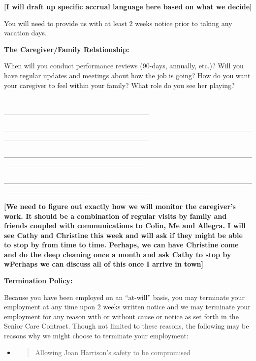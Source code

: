 \documentclass[]{article}
\begin{document}
\textbf{{[}I will draft up specific accrual language here based on what
we decide{]}}

You will need to provide us with at least 2 weeks notice prior to taking
any vacation days.

\textbf{The Caregiver/Family Relationship:}

When will you conduct performance reviews (90-days, annually, etc.)?
Will you have regular updates and meetings about how the job is going?
How do you want your caregiver to feel within your family? What role do
you see her playing?

\_\_\_\_\_\_\_\_\_\_\_\_\_\_\_\_\_\_\_\_\_\_\_\_\_\_\_\_\_\_\_\_\_\_\_\_\_\_\_\_\_\_\_\_\_\_\_\_\_\_\_\_\_\_\_\_\_\_\_\_\_\_\_\_\_\_\_\_\_\_\_\_\_\_\_\_

\_\_\_\_\_\_\_\_\_\_\_\_\_\_\_\_\_\_\_\_\_\_\_\_\_\_\_\_\_\_\_\_\_\_\_\_\_\_\_\_\_\_\_\_\_\_\_\_\_\_\_\_\_\_\_\_\_\_\_\_\_\_\_\_\_\_\_\_\_\_\_\_\_\_\_\_

\_\_\_\_\_\_\_\_\_\_\_\_\_\_\_\_\_\_\_\_\_\_\_\_\_\_\_\_\_\_\_\_\_\_\_\_\_\_\_\_\_\_\_\_\_\_\_\_\_\_\_\_\_\_\_\_\_\_\_\_\_\_\_\_\_\_\_\_\_\_\_\_\_\_\_

\_\_\_\_\_\_\_\_\_\_\_\_\_\_\_\_\_\_\_\_\_\_\_\_\_\_\_\_\_\_\_\_\_\_\_\_\_\_\_\_\_\_\_\_\_\_\_\_\_\_\_\_\_\_\_\_\_\_\_\_\_\_\_\_\_\_\_\_\_\_\_\_\_\_\_\_

\textbf{{[}We need to figure out exactly how we will monitor the
caregiver's work. It should be a combination of regular visits by family
and friends coupled with communications to Colin, Me and Allegra. I will
see Cathy and Christine this week and will ask if they might be able to
stop by from time to time. Perhaps, we can have Christine come and do
the deep cleaning once a month and ask Cathy to stop by wPerhaps we can
discuss all of this once I arrive in town{]}}

\textbf{Termination Policy:}

Because you have been employed on an ``at-will'' basis, you may
terminate your employment at any time upon 2 weeks written notice and we
may terminate your employment for any reason with or without cause or
notice as set forth in the Senior Care Contract. Though not limited to
these reasons, the following may be reasons why we might choose to
terminate your employment:

\begin{itemize}
\item
  \begin{quote}
  Allowing Joan Harrison's safety to be compromised
  \end{quote}
\end{itemize}
\end{document}

